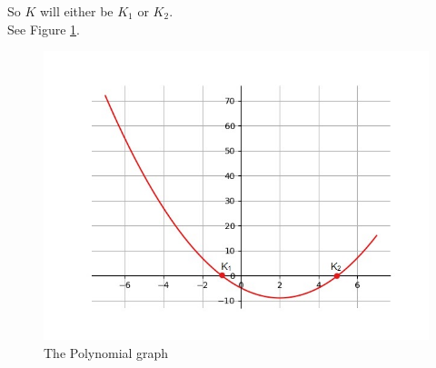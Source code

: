 \documentclass[journal,12pt,twocolumn]{article}\usepackage[margin=1.25 in]{geometry}
\begin{document}
\begin{flushleft}
So $K$ will either be $K_1$ or $K_2$.\\
See Figure
	  \ref{fig:InkedFigure_1_py_LI.jpg}.
\begin{figure}
	  \centering 
	  \includegraphics[width=\columnwidth]{figs/InkedFigure_1_py_LI.jpg}
	  \caption{The Polynomial graph}
	  \label{fig:InkedFigure_1_py_LI.jpg}
	  \end{figure}
\end{flushleft}
\end{document}
